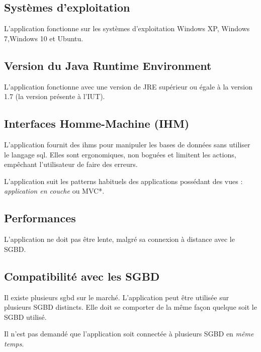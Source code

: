 \subsection{Systèmes d'exploitation}
L'application fonctionne sur les systèmes d'exploitation Windows XP, Windows 7,Windows 10 et Ubuntu.

\subsection{Version du Java Runtime Environment}
L'application fonctionne avec une version de \gls{JRE} supérieur ou égale à la version 1.7 (la version présente à l'IUT).

\subsection{Interfaces Homme-Machine (IHM)}
L'application fournit des \glspl{ihm} pour manipuler les bases de données sans utiliser le langage \gls{sql}.
Elles sont ergonomiques, non boguées et limitent les actions, empêchant l'utilisateur de faire des erreurs.

L'application suit les patterns habituels des applications possédant des vues :
\textit{application en couche} ou \gls{MVC}*.

\subsection{Performances}
L'application ne doit pas être lente, malgré sa connexion à distance avec le SGBD.

\subsection{Compatibilité avec les SGBD}
Il existe plusieurs \gls{sgbd} sur le marché.
L'application peut être utilisée sur plusieurs SGBD distincts.
Elle doit se comporter de la même façon quelque soit le SGBD utilisé.

Il n'est pas demandé que l'application soit connectée à plusieurs SGBD en \textit{même temps}.
